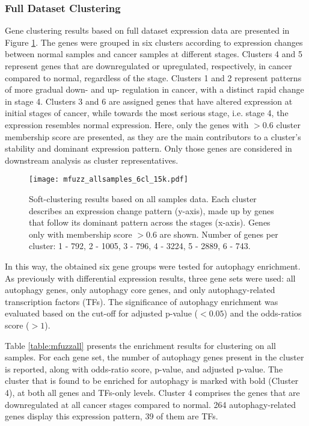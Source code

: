         \subsubsection{Full Dataset Clustering}
         Gene clustering results based on full dataset expression data are presented in Figure \ref{fig:mfuzzall}. The genes were grouped in six clusters according to expression changes between normal samples and cancer samples at different stages. 
         Clusters 4 and 5 represent genes that are downregulated or upregulated, respectively, in cancer compared to normal, regardless of the stage. Clusters 1 and 2 represent patterns of more gradual down- and up- regulation in cancer, with a distinct rapid change in stage 4. Clusters 3 and 6 are assigned genes that have altered expression at initial stages of cancer, while towards the most serious stage, i.e. stage 4, the expression resembles normal expression. 
         Here, only the genes with $>0.6$ cluster membership score are presented, as they are the main contributors to a cluster's stability and dominant expression pattern. Only those genes are considered in downstream analysis as cluster representatives. 

        
            \begin{figure}[!h]
            \centering
            \texttt{[image: mfuzz\_allsamples\_6cl\_15k.pdf]} 
            \caption{Soft-clustering results based on all samples data. Each cluster describes an expression change pattern (y-axis), made up by genes that follow its dominant pattern across the stages (x-axis). Genes only with membership score $>0.6$ are shown. Number of genes per cluster: 1 - 792, 2 - 1005, 3 - 796, 4 - 3224, 5 - 2889, 6 - 743.}
            \label{fig:mfuzzall}
            \end{figure}
            
        In this way, the obtained six gene groups were tested for autophagy enrichment. As previously with differential expression results, three gene sets were used: all autophagy genes, only autophagy core genes, and only autophagy-related transcription factors (TFs). The significance of autophagy enrichment was evaluated based on the cut-off for adjusted p-value ($<0.05$) and the odds-ratios score ($>1$).
        
        Table \ref{table:mfuzzall} presents the enrichment results for clustering on all samples. For each gene set, the number of autophagy genes present in the cluster is reported, along with odds-ratio score, p-value, and adjusted p-value. The cluster that is found to be enriched for autophagy is marked with bold (Cluster 4), at both all genes and TFs-only levels. Cluster 4 comprises the genes that are downregulated at all cancer stages compared to normal. 264 autophagy-related genes display this expression pattern, 39 of them are TFs.
    

